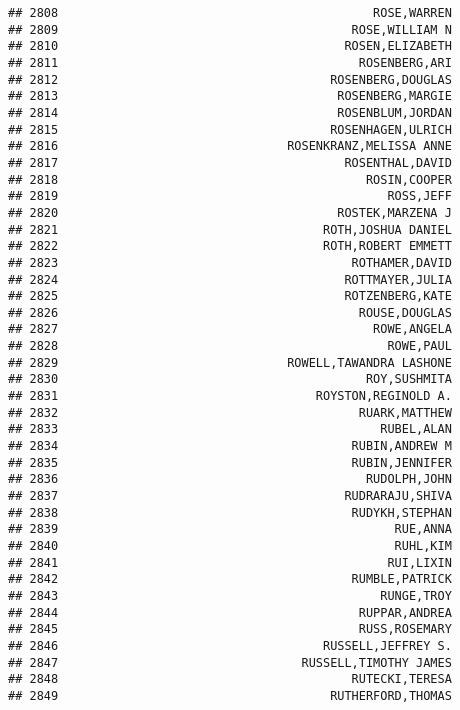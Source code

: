 \documentclass[
]{article}
\begin{document}
\begin{verbatim}
## 2808                                            ROSE,WARREN
## 2809                                         ROSE,WILLIAM N
## 2810                                        ROSEN,ELIZABETH
## 2811                                          ROSENBERG,ARI
## 2812                                      ROSENBERG,DOUGLAS
## 2813                                       ROSENBERG,MARGIE
## 2814                                       ROSENBLUM,JORDAN
## 2815                                      ROSENHAGEN,ULRICH
## 2816                                ROSENKRANZ,MELISSA ANNE
## 2817                                        ROSENTHAL,DAVID
## 2818                                           ROSIN,COOPER
## 2819                                              ROSS,JEFF
## 2820                                       ROSTEK,MARZENA J
## 2821                                     ROTH,JOSHUA DANIEL
## 2822                                     ROTH,ROBERT EMMETT
## 2823                                         ROTHAMER,DAVID
## 2824                                        ROTTMAYER,JULIA
## 2825                                        ROTZENBERG,KATE
## 2826                                          ROUSE,DOUGLAS
## 2827                                            ROWE,ANGELA
## 2828                                              ROWE,PAUL
## 2829                                ROWELL,TAWANDRA LASHONE
## 2830                                           ROY,SUSHMITA
## 2831                                    ROYSTON,REGINOLD A.
## 2832                                          RUARK,MATTHEW
## 2833                                             RUBEL,ALAN
## 2834                                         RUBIN,ANDREW M
## 2835                                         RUBIN,JENNIFER
## 2836                                           RUDOLPH,JOHN
## 2837                                        RUDRARAJU,SHIVA
## 2838                                         RUDYKH,STEPHAN
## 2839                                               RUE,ANNA
## 2840                                               RUHL,KIM
## 2841                                              RUI,LIXIN
## 2842                                         RUMBLE,PATRICK
## 2843                                             RUNGE,TROY
## 2844                                          RUPPAR,ANDREA
## 2845                                          RUSS,ROSEMARY
## 2846                                     RUSSELL,JEFFREY S.
## 2847                                  RUSSELL,TIMOTHY JAMES
## 2848                                         RUTECKI,TERESA
## 2849                                      RUTHERFORD,THOMAS

\end{verbatim}
\end{document}
